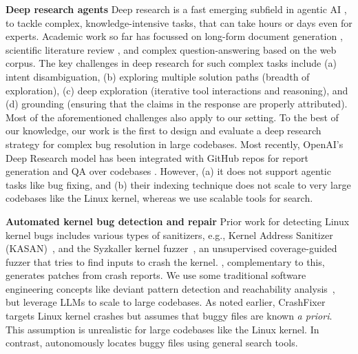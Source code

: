 \textbf{Deep research agents} Deep research is a fast emerging subfield in agentic AI \citep{microsoftdr,openaidr,geminidr,perplexitydr}, to tackle complex, knowledge-intensive tasks, that can take hours or days even for experts. Academic work so far has focussed on long-form document generation \citep{godbole2024analysis,shao2024assisting}, scientific literature review \citep{wu2025unfolding,gottweis2025towards}, and complex question-answering \citep{li2025webthinker,wu2025agentic} based on the web corpus. The key challenges in deep research for such complex tasks include (a) intent disambiguation, (b) exploring multiple solution paths (breadth of exploration), (c) deep exploration (iterative tool interactions and reasoning), and (d) grounding (ensuring that the claims in the response are properly attributed). Most of the aforementioned challenges also apply to our setting. To the best of our knowledge, our work is the first to design and evaluate a deep research strategy for complex bug resolution in large codebases. Most recently, OpenAI's Deep Research model has been integrated with GitHub repos for report generation and QA over codebases \citep{OpenAIDRGH}. However, (a) it does not support agentic tasks like bug fixing, and
(b) their indexing technique does not scale to very large codebases like the Linux kernel, whereas we use scalable tools for search.

\textbf{Automated kernel bug detection and repair} Prior work for detecting Linux kernel bugs includes various types of sanitizers, e.g., Kernel Address Sanitizer (KASAN)~\citep{kasan}, and the Syzkaller kernel fuzzer~\citep{syzkaller}, an unsupervised coverage-guided fuzzer that tries to find inputs to crash the kernel. 
\cresearcher{}, complementary to this, generates patches from crash reports.
We use some traditional software engineering concepts like deviant pattern detection \citep{deviant} and reachability analysis~\citep{nielson2015principles}, but leverage LLMs to scale to large codebases.
As noted earlier, CrashFixer~\citep{crashfixer} targets Linux kernel crashes but assumes that buggy files are known \emph{a priori}. This assumption is unrealistic for large codebases like the Linux kernel. In contrast, \cresearcher{} autonomously locates buggy files using general search tools.
